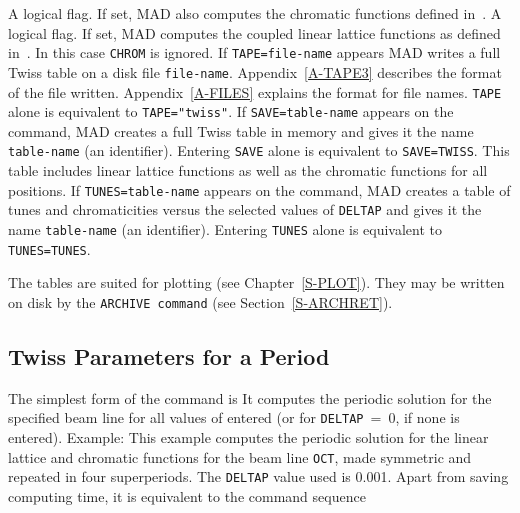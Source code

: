 \begin{mylist}
A logical flag.
If set, MAD also computes the chromatic functions defined in~\cite{B-MON79}.
A logical flag.
If set,
MAD computes the coupled linear lattice functions as defined
in~\cite{B-EDW72,B-TEN71}.
In this case {\tt CHROM} is ignored.
If {\tt TAPE=file-name} appears
MAD writes a full Twiss table on a disk file {\tt file-name}.
Appendix~\ref{A-TAPE3} describes the format of the file written.
Appendix~\ref{A-FILES} explains the format for file names.
{\tt TAPE} alone is equivalent to {\tt TAPE="twiss"}.
If {\tt SAVE=table-name} appears on the command,
MAD creates a full Twiss table in memory and gives it the name
{\tt table-name} (an identifier).
Entering {\tt SAVE} alone is equivalent to {\tt SAVE=TWISS}.
This table includes linear lattice functions as well as the chromatic
functions for all positions.
If {\tt TUNES=table-name} appears on the command,
MAD creates a table of tunes and chromaticities versus the selected
values of {\tt DELTAP} and gives it the name {\tt table-name}
(an identifier).
Entering {\tt TUNES} alone is equivalent to {\tt TUNES=TUNES}.
\end{mylist}
The tables are suited for plotting (see Chapter~\ref{S-PLOT}).
They may be written on disk by the {\tt ARCHIVE command}
(see Section~\ref{S-ARCHRET}).
 
\subsection{Twiss Parameters for a Period}
The simplest form of the  command is
It computes the periodic solution for the specified beam
line for all values of  entered
(or for {\tt DELTAP}~=~0, if none is entered).
Example:
This example computes the periodic solution for the linear lattice
and chromatic functions for the beam line {\tt OCT},
made symmetric and repeated in four superperiods.
The {\tt DELTAP} value used is 0.001.
Apart from saving computing time,
it is equivalent to the command sequence
 
